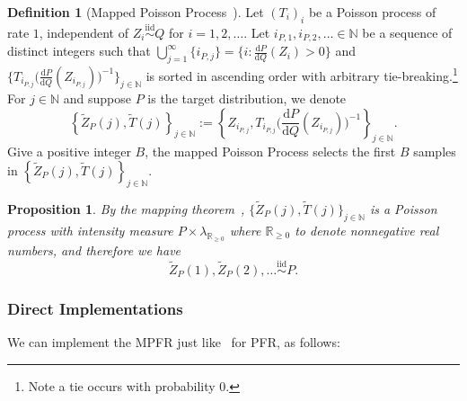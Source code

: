 \documentclass{article}
\theoremstyle{plain}
\newtheorem{proposition}[theorem]{Proposition}
\theoremstyle{definition}
\newtheorem{definition}[theorem]{Definition}
\begin{document}
\begin{definition}[Mapped Poisson Process~\citep{li2021unified}] \label{def::mapped_PP}
Let $(T_{i})_{i}$ be a Poisson process of rate $1$,
independent of $Z_{i}\stackrel{\mathrm{iid}}{\sim}Q$ for $i=1,2,\ldots$. 
Let $i_{P, 1},i_{P, 2}, \ldots\in\mathbb{N}$ be a sequence of distinct integers such that $\bigcup_{j=1}^\infty \big\{i_{P, j} \big\} = \big\{i:\frac{\mathrm{d}P}{\mathrm{d}Q}(Z_{i})>0 \big\}$ and $\big\{T_{i_{P, j}} \big(\frac{\mathrm{d}P}{\mathrm{d}Q}(Z_{i_{P, j}})\big)^{-1} \big\}_{j \in \mathbb{N}}$ is sorted in ascending order with arbitrary tie-breaking.\footnote{Note a tie occurs with probability $0$.}
For $j \in\mathbb{N}$ and suppose $P$ is the target distribution, we denote
\begin{equation}
    \left\{
    \tilde{Z}_P(j), \tilde{T}(j)
    \right\}_{j\in\mathbb{N}} 
    := \left\{ Z_{i_{P, j}}, T_{i_{P, j}}
    \big(\frac{\mathrm{d}P}{\mathrm{d}Q}(Z_{i_{P, j}})\big)^{-1} \right\}_{j\in\mathbb{N}}. 
\end{equation}
Give a positive integer $B$, the mapped Poisson Process selects the first $B$ samples in $\left\{ \tilde{Z}_P(j), \tilde{T}(j) \right\}_{j\in\mathbb{N}}$. 
\end{definition}


\begin{proposition}
\label{prop:ppr_output_dist}
By the mapping theorem~\citep{last2017lectures}, $\big\{ \tilde{Z}_P(j), \tilde{T}(j) \big\}_{j\in\mathbb{N}}$ is a Poisson process with intensity measure $P\times \lambda_{\mathbb{R}_{\geq 0}}$ where $\mathbb{R}_{\geq 0}$ to denote nonnegative real numbers, and therefore we have 
\begin{equation}
    \tilde{Z}_P (1), \tilde{Z}_P (2), \ldots \stackrel{\mathrm{iid}}{\sim} P.
\end{equation}
\end{proposition}







\subsubsection{Direct Implementations}
\label{subapp::direct_implementation_MPFR}
We can implement the MPFR just like~\citep{theis2022algorithms} for PFR, as follows: 
\end{document}
